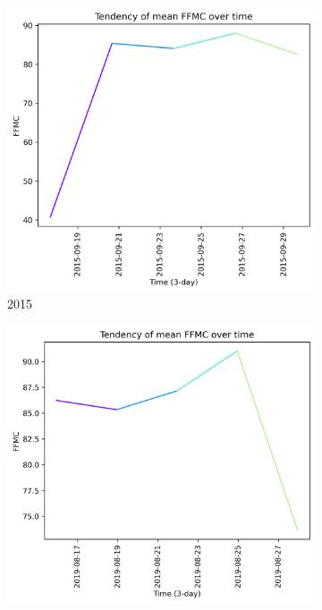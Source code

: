 \begin{figure}[h]
    \centering
    \caption{FFMC values 15 days prior to wildfire}
    \begin{subfigure}{0.3\textwidth}
        \centering
        \includegraphics[width=\textwidth]{graphs/2015/15daysprior/2015_15daysprior_tendency_graph_FFMC.png}
        \caption{2015}
        \label{fig:ffmc_prior_15_days_2015}
    \end{subfigure}
    \hfill
    \begin{subfigure}{0.3\textwidth}
        \centering
        \includegraphics[width=\textwidth]{graphs/2019/15daysprior/2019_15daysprior_tendency_graph_FFMC.png}

\end{subfigure}
\end{figure}
